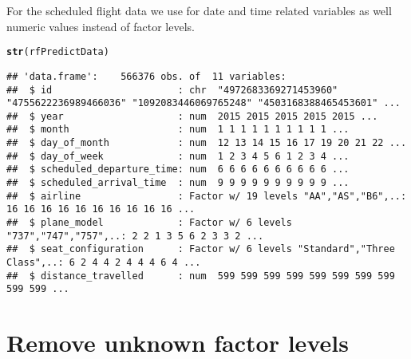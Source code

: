 \documentclass{article}\usepackage[]{graphicx}\usepackage[]{color}
\makeatletter
\newcommand{\hlstd}[1]{\textcolor[rgb]{0.345,0.345,0.345}{#1}}%
\newcommand{\hlkwd}[1]{\textcolor[rgb]{0.737,0.353,0.396}{\textbf{#1}}}%
\newenvironment{kframe}{%
 \def\at@end@of@kframe{}%
 \ifinner\ifhmode%
  \def\at@end@of@kframe{\end{minipage}}%
  \begin{minipage}{\columnwidth}%
 \fi\fi%
 \def\FrameCommand##1{\hskip\@totalleftmargin \hskip-\fboxsep
 \colorbox{shadecolor}{##1}\hskip-\fboxsep
     \hskip-\linewidth \hskip-\@totalleftmargin \hskip\columnwidth}%
 \MakeFramed {\advance\hsize-\width
   \@totalleftmargin\z@ \linewidth\hsize
   \@setminipage}}%
 {\par\unskip\endMakeFramed%
 \at@end@of@kframe}
\newenvironment{knitrout}{}{} %
\makeatother
\begin{document}
For the scheduled flight data we use for date and time related variables as well numeric values instead of factor levels.

\begin{knitrout}
\color{fgcolor}\begin{kframe}
\begin{alltt}
\hlkwd{str}\hlstd{(rfPredictData)}
\end{alltt}
\begin{verbatim}
## 'data.frame':	566376 obs. of  11 variables:
##  $ id                      : chr  "4972683369271453960" "4755622236989466036" "1092083446069765248" "4503168388465453601" ...
##  $ year                    : num  2015 2015 2015 2015 2015 ...
##  $ month                   : num  1 1 1 1 1 1 1 1 1 1 ...
##  $ day_of_month            : num  12 13 14 15 16 17 19 20 21 22 ...
##  $ day_of_week             : num  1 2 3 4 5 6 1 2 3 4 ...
##  $ scheduled_departure_time: num  6 6 6 6 6 6 6 6 6 6 ...
##  $ scheduled_arrival_time  : num  9 9 9 9 9 9 9 9 9 9 ...
##  $ airline                 : Factor w/ 19 levels "AA","AS","B6",..: 16 16 16 16 16 16 16 16 16 16 ...
##  $ plane_model             : Factor w/ 6 levels "737","747","757",..: 2 2 1 3 5 6 2 3 3 2 ...
##  $ seat_configuration      : Factor w/ 6 levels "Standard","Three Class",..: 6 2 4 4 2 4 4 4 6 4 ...
##  $ distance_travelled      : num  599 599 599 599 599 599 599 599 599 599 ...
\end{verbatim}
\end{kframe}
\end{knitrout}

\section{Remove unknown factor levels}
\end{document}
